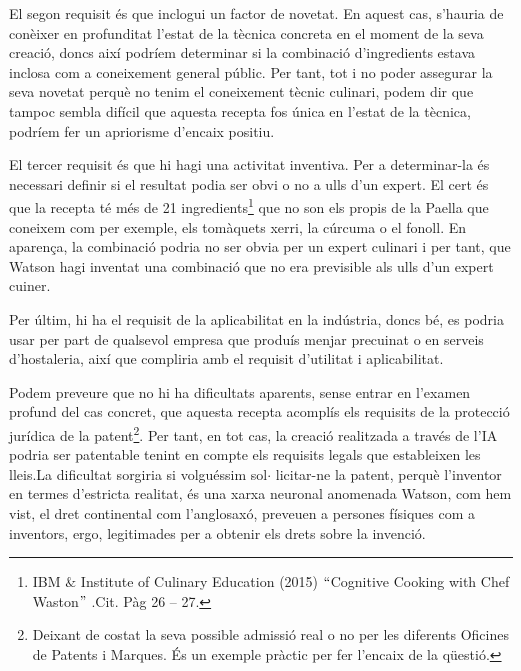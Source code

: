 \documentclass[12pt]{article}
\renewcommand{\_}{\kern-1.5pt\textunderscore\kern-1.5pt}
\begin{document}
\begin{itemize}
\vspace{\baselineskip}
\begin{justify}
El segon requisit és que inclogui un factor de novetat. En aquest cas, s’hauria de conèixer en profunditat l’estat de la tècnica concreta en el moment de la seva creació, doncs així podríem determinar si la combinació d’ingredients estava inclosa com a coneixement general públic. Per tant, tot i no poder assegurar la seva novetat perquè no tenim el coneixement tècnic culinari, podem dir que tampoc sembla difícil que aquesta recepta fos única en l’estat de la tècnica, podríem fer un apriorisme d’encaix positiu.
\end{justify}\par


\vspace{\baselineskip}
\begin{justify}
El tercer requisit és que hi hagi una activitat inventiva. Per a determinar-la és necessari definir si el resultat podia ser obvi o no a ulls d’un expert. El cert és que la recepta té més de 21 ingredients\footnote{ IBM $\&$  Institute of Culinary Education (2015) $``$Cognitive Cooking with Chef Waston$"$  .Cit. Pàg 26 – 27. } que no son els propis de la Paella que coneixem com per exemple, els tomàquets xerri, la cúrcuma o el fonoll. En aparença, la combinació podria no ser obvia per un expert culinari i per tant, que Watson hagi inventat una combinació que no era previsible als ulls d’un expert cuiner.
\end{justify}\par


\vspace{\baselineskip}
\begin{justify}
Per últim, hi ha el requisit de la aplicabilitat en la indústria, doncs bé, es podria usar per part de qualsevol empresa que produís menjar precuinat o en serveis d’hostaleria, així que compliria amb el requisit d’utilitat i aplicabilitat.  
\end{justify}\par


\vspace{\baselineskip}
\begin{justify}
Podem preveure que no hi ha dificultats aparents, sense entrar en l’examen profund del cas concret, que aquesta recepta acomplís els requisits de la protecció jurídica de la patent\footnote{ Deixant de costat la seva possible admissió real o no per les diferents Oficines de Patents i Marques. És un exemple pràctic per fer l’encaix de la qüestió.  }. Per tant, en tot cas, la creació realitzada a través de l’IA podria ser patentable tenint en compte els requisits legals que estableixen les lleis.La dificultat sorgiria si volguéssim sol$ \cdot $ licitar-ne la patent, perquè l’inventor en termes d’estricta realitat, és una xarxa neuronal anomenada Watson, com hem vist, el dret continental com l’anglosaxó, preveuen a persones físiques com a inventors, ergo, legitimades per a obtenir els drets sobre la invenció. 
\end{justify}\par



\end{itemize}
\end{document}
